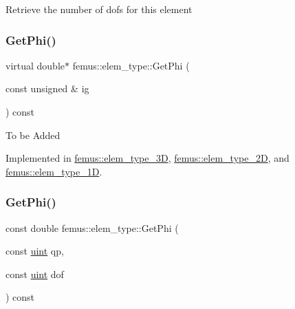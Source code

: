 Retrieve the number of dofs for this element \mbox{\label{classfemus_1_1elem__type_a2aa2a37b15debbee27918f5e3f2df6b3}} 
\subsubsection{\texorpdfstring{Get\+Phi()}{GetPhi()}\hspace{0.1cm}{\footnotesize\ttfamily [1/2]}}
{\footnotesize\ttfamily virtual double$\ast$ femus\+::elem\+\_\+type\+::\+Get\+Phi (\begin{DoxyParamCaption}\item[{const unsigned \&}]{ig }\end{DoxyParamCaption}) const\hspace{0.3cm}{\ttfamily [pure virtual]}}

To be Added 

Implemented in \mbox{\hyperlink{classfemus_1_1elem__type__3_d_ac25f62fb2b22b534172ce6ef94b89068}{femus\+::elem\+\_\+type\+\_\+3D}}, \mbox{\hyperlink{classfemus_1_1elem__type__2_d_a9e2ed95e14dbbf28d6399c50ba83ebe9}{femus\+::elem\+\_\+type\+\_\+2D}}, and \mbox{\hyperlink{classfemus_1_1elem__type__1_d_ac3bf43aa0c1c02c1113228011462a893}{femus\+::elem\+\_\+type\+\_\+1D}}.

\mbox{\label{classfemus_1_1elem__type_a0112208bbdff765b47effbe352734fbe}} 
\subsubsection{\texorpdfstring{Get\+Phi()}{GetPhi()}\hspace{0.1cm}{\footnotesize\ttfamily [2/2]}}
{\footnotesize\ttfamily const double femus\+::elem\+\_\+type\+::\+Get\+Phi (\begin{DoxyParamCaption}\item[{const \mbox{\hyperlink{_typedefs_8hpp_a91ad9478d81a7aaf2593e8d9c3d06a14}{uint}}}]{qp,  }\item[{const \mbox{\hyperlink{_typedefs_8hpp_a91ad9478d81a7aaf2593e8d9c3d06a14}{uint}}}]{dof }\end{DoxyParamCaption}) const\hspace{0.3cm}{\ttfamily [inline]}}

